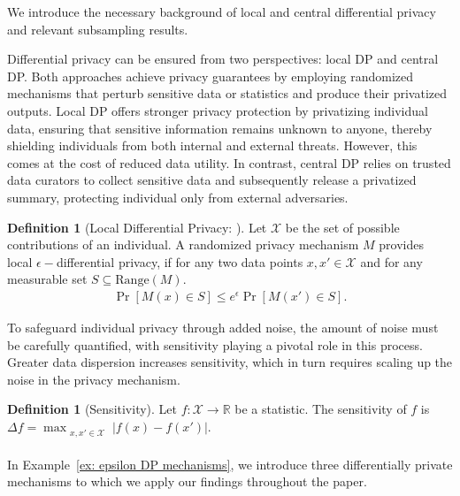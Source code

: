 \documentclass{article}
\theoremstyle{definition}
\newtheorem{definition}[theorem]{Definition}
\begin{document}
We introduce the necessary background of local and central differential privacy and relevant subsampling results.

Differential privacy can be ensured from two perspectives: local DP and central DP. Both approaches achieve privacy guarantees by employing randomized mechanisms that perturb sensitive data or statistics and produce their privatized outputs. Local DP offers stronger privacy protection by privatizing individual data, ensuring that sensitive information remains unknown to anyone, thereby shielding individuals from both internal and external threats. However, this comes at the cost of reduced data utility. In contrast, central DP relies on trusted data curators to collect sensitive data and subsequently release a privatized summary, protecting individual only from external adversaries. 

\begin{definition}[Local Differential Privacy: \citet{duchi2013local}]
    Let $\mathcal{X}$ be the set of possible contributions of an individual. A randomized privacy mechanism ${M}$ provides local $\epsilon-$differential privacy, if for any two data points $x, x' \in \mathcal{X}$ and for any measurable set $S \subseteq \text{Range}({M})$.
    \begin{align*}
        \Pr[{M}(x) \in S] \leq e^{\epsilon} \Pr[{M}(x') \in S].
    \end{align*}
     
\end{definition}

To safeguard individual privacy through added noise, the amount of noise must be carefully quantified, with sensitivity playing a pivotal role in this process. Greater data dispersion increases sensitivity, which in turn requires scaling up the noise in the privacy mechanism.

\begin{definition}[Sensitivity]
    Let $f: \mathcal{X} \to \mathbb{R}$ be a statistic. The sensitivity of $f$ is 
        $\Delta f = \max_{\substack{%
    x, x' \in \mathcal{X}\\
     }}
      \!  | f(x) - f(x') |$.
\end{definition}

In Example~\ref{ex: epsilon DP mechanisms}, we introduce three differentially private mechanisms to which we apply our findings throughout the paper.
\end{document}
